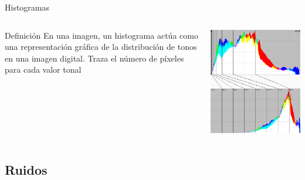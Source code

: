 \documentclass{beamer}
\begin{document}
\begin{frame}{Histogramas}
\begin{columns}

\column[t]{6cm}
\begin{block}{Definición}
\justifying
En una imagen, un histograma actúa como una representación gráfica de la distribución de tonos en una imagen digital. Traza el número de píxeles para cada valor tonal
\end{block}

\column[t]{4cm}
\begin{center}
\includegraphics[scale=0.2]{./.Presentation/linlog}
\end{center}
\end{columns}
\end{frame}


\subsection{Ruidos}
\end{document}
